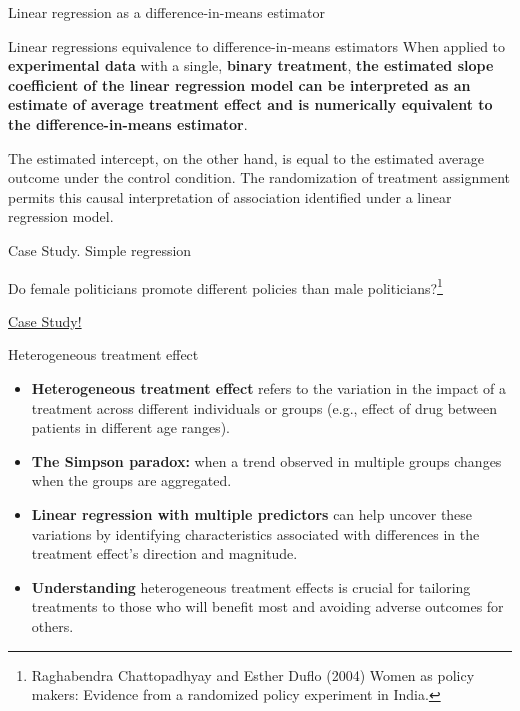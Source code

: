 \documentclass[aspectratio=169]{beamer}
\begin{document}
\begin{frame}{Linear regression as a difference-in-means estimator}

\begin{coolblock}{Linear regressions equivalence to difference-in-means estimators}
    When applied to \textbf{experimental data} with a single, \textbf{binary treatment}, \textbf{the estimated slope coefficient of the linear regression model can be interpreted as an estimate of average treatment effect and is numerically equivalent to the difference-in-means estimator}. 
    \vspace{0.2cm}
    
    The estimated intercept, on the other hand, is equal to the estimated average outcome under the control condition. The randomization of treatment assignment permits this causal interpretation of  association identified under a linear regression model.
\end{coolblock}
    
\end{frame}

\begin{frame}{Case Study. Simple regression}

    \begin{center}
        Do female politicians promote different policies than male politicians?\footnote{\scriptsize Raghabendra Chattopadhyay and Esther Duflo (2004) Women as policy makers: Evidence from a randomized policy experiment in India.}
        \vspace{1cm}

        {\Large \href{url}{Case Study!}}
    \end{center}
    
\end{frame}

\begin{frame}{Heterogeneous treatment effect}
    \begin{itemize}
        \item \textbf{Heterogeneous treatment effect} refers to the variation in the impact of a treatment across different individuals or groups (e.g., effect of drug between patients in different age ranges). 
        \item \textbf{The Simpson paradox:} when a trend observed in multiple groups changes when the groups are aggregated.
        \item \textbf{Linear regression with multiple predictors} can help uncover these variations by identifying characteristics associated with differences in the treatment effect's direction and magnitude.
        \item \textbf{Understanding} heterogeneous treatment effects is crucial for tailoring treatments to those who will benefit most and avoiding adverse outcomes for others. 
    \end{itemize}
\end{frame}
\end{document}
